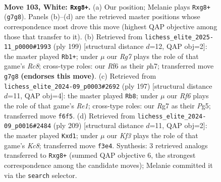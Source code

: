 \documentclass[11pt]{article}
\begin{document}
\clearpage

\begin{figure}[p]\centering
\begin{subfigure}{0.46\textwidth}\centering
\resizebox{\linewidth}{!}{%
\newchessgame
\chessboard[
  setfen={2k3r1/6R1/5R2/8/8/5K2/8/8 w - - 3 103},
  showmover=false,
  pgfstyle=straightmove, color=movearrow, markmove={g7-g8}
]}
\caption{}
\end{subfigure}\hfill
\begin{subfigure}{0.46\textwidth}\centering
\resizebox{\linewidth}{!}{%
\newchessgame
\chessboard[
  setfen={5k2/2R4P/8/8/8/1K6/8/2r5 b - - 64 100},
  showmover=false,
  pgfstyle=straightmove, color=movearrow, markmove={c1-b1}
]}
\caption{}
\end{subfigure}
\\[4pt]
\begin{subfigure}{0.46\textwidth}\centering
\resizebox{\linewidth}{!}{%
\newchessgame
\chessboard[
  setfen={4r1k1/8/8/6pR/8/7K/8/8 b - - 27 99},
  showmover=false,
  pgfstyle=straightmove, color=movearrow, markmove={e8-b8}
]}
\caption{}
\end{subfigure}\hfill
\begin{subfigure}{0.46\textwidth}\centering
\resizebox{\linewidth}{!}{%
\newchessgame
\chessboard[
  setfen={8/8/8/8/3K4/r7/8/2kR4 b - - 0 105},
  showmover=false,
  pgfstyle=straightmove, color=movearrow, markmove={c1-d1}
]}
\caption{}
\end{subfigure}
\caption{\textbf{Move 103, White: \texttt{Rxg8+}.} (a) Our position; Melanie plays \texttt{Rxg8+} (\texttt{g7g8}). Panels (b)--(d) are the retrieved master positions whose correspondence most drove this move (highest QAP objective among those that transfer to it). (b) Retrieved from \texttt{lichess\_elite\_2025-11\_p0000\#1993} (ply 199) [structural distance $d$=12, QAP obj=2]: the master played \texttt{Rb1+}; under $\mu$ our \emph{Rg7} plays the role of that game's \emph{Rc8}; cross-type roles: our \emph{R}f6 as their \emph{p}h7; transferred move \texttt{g7g8} \textbf{(endorses this move)}. (c) Retrieved from \texttt{lichess\_elite\_2024-09\_p0003\#2692} (ply 197) [structural distance $d$=11, QAP obj=4]: the master played \texttt{Rb8}; under $\mu$ our \emph{Rf6} plays the role of that game's \emph{Re1}; cross-type roles: our \emph{R}g7 as their \emph{P}g5; transferred move \texttt{f6f5}. (d) Retrieved from \texttt{lichess\_elite\_2024-09\_p0016\#2484} (ply 209) [structural distance $d$=11, QAP obj=2]: the master played \texttt{Kxd1}; under $\mu$ our \emph{Kf3} plays the role of that game's \emph{Kc8}; transferred move \texttt{f3e4}. Synthesis: 3 retrieved analogs transferred to \texttt{Rxg8+} (summed QAP objective 6, the strongest correspondence among the candidate moves); Melanie committed it via the \texttt{search} selector.}
\label{fig:thought-m204}
\end{figure}
\end{document}
